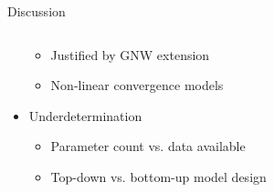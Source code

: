 \begin{frame}{Discussion}
\begin{columns}
\begin{column}{0.5\textwidth}
\begin{itemize}
\begin{itemize}
        \item Justified by GNW extension
        \item Non-linear convergence models
    \end{itemize}
    \item<3| handout:3> Underdetermination
    \begin{itemize}
        \item Parameter count vs. data available
        \item Top-down vs. bottom-up model design~\cite{Nielsen2017}

\end{itemize}
\end{itemize}
\end{column}
\end{columns}
\end{frame}
